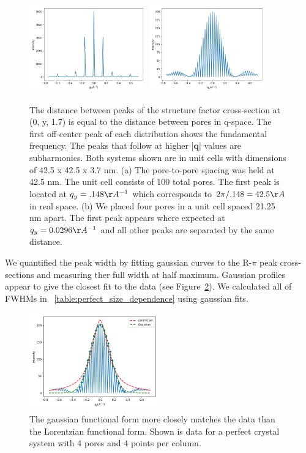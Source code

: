 \documentclass{article}
\begin{document}
  \begin{figure}[!htb]
  \centering
  \includegraphics[width=0.45\textwidth]{constant_p2p.png}
  \includegraphics[width=0.45\textwidth]{constant_npores.png}
  \caption{The distance between peaks of the structure factor cross-section at
  (0, y, 1.7) is equal to the distance between pores in q-space. The first off-center
  peak of each distribution shows the fundamental frequency. The peaks that follow at 
  higher |$\mathbf{q}$| values are subharmonics. Both systems shown are in unit cells 
  with dimensions of 42.5 x 42.5 x 3.7 nm. (a) The pore-to-pore spacing was held at 
  42.5 nm. The unit cell consists of 100 total pores. The first peak is located at 
  $q_y = .148 \AA^{-1}$ which corresponds to $2\pi / .148 = 42.5 \AA$ in real space. (b)
  We placed four pores in a unit cell spaced 21.25 nm apart. The first peak appears where
  expected at $q_y = 0.0296 \AA^{-1}$ and all other peaks are separated by the same distance.
  }\label{fig:p2p_rpi}
  \end{figure}

  We quantified the peak width by fitting gaussian curves to the R-$\pi$ peak
  cross-sections and measuring ther full width at half maximum. Gaussian profiles
  appear to give the closest fit to the data (see Figure~\ref{fig:fwhm_fits}). We
  calculated all of FWHMs in ~\ref{table:perfect_size_dependence} using gaussian
  fits.

  \begin{figure}[!htb]
  \centering
  \includegraphics[width=0.5\textwidth]{fwhm_fits.png}
  \caption{The gaussian functional form more closely matches the data than the Lorentzian
  functional form. Shown is data for a perfect crystal system with 4 pores and 4 points
  per column.}\label{fig:fwhm_fits}
  \end{figure}
\end{document}
